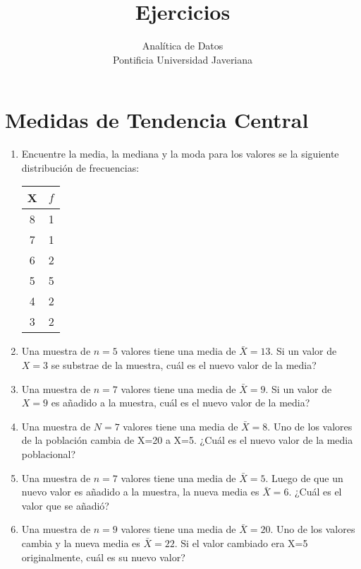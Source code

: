 \documentclass[letterpaper]{article}
\date{\vspace{-5ex}}
\begin{document}
\title{{\bf Ejercicios}} 
\author{Analítica de Datos  \\
	Pontificia Universidad Javeriana}


\maketitle


\section{Medidas de Tendencia Central}
\begin{enumerate}
	\item Encuentre la media, la mediana y la moda para los valores se la siguiente distribución de frecuencias:
	\begin{table}[H]
		\centering
		\begin{tabular}{|c|c|} \hline
			X & $f$\\ \hline
			8 & 1 \\
			7 & 1\\
			6 & 2\\
			5 & 5\\
			4 & 2\\
			3 & 2\\ \hline
		\end{tabular}
	\end{table}
	\item Una muestra de $n=5$ valores tiene una media de $\bar{X}=13$. Si un valor de $X=3$ se substrae de la muestra, cuál es el nuevo valor de la media?
	\item Una muestra de $n=7$ valores tiene una media de $\bar{X}=9$. Si un valor de $X=9$ es añadido a la muestra, cuál es el nuevo valor de la media?
	\item Una muestra de $N=7$ valores tiene una media de $\bar{X}=8$. Uno de los valores de la población cambia de X=20 a X=5. ¿Cuál es el nuevo valor de la media poblacional?
	\item Una muestra de $n=7$ valores tiene una media de $\bar{X}=5$. Luego de que un nuevo valor es añadido a la muestra, la nueva media es $\bar{X}=6$. ¿Cuál es el valor que se añadió?
	\item Una muestra de $n=9$ valores tiene una media de $\bar{X}=20$. Uno de los valores cambia y la nueva media es $\bar{X}=22$. Si el valor cambiado era X=5 originalmente, cuál es su nuevo valor?


\end{enumerate}
\end{document}
